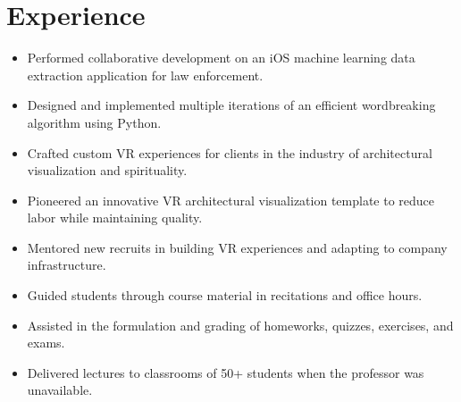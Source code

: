\documentclass[]{deedy_resume}
\begin{document}
\hfill
\begin{minipage}[t]{0.63\textwidth} 


\section{Experience}
\begin{itemize}[noitemsep,topsep=0pt]
\item Performed collaborative development on an iOS machine learning data extraction application for law enforcement.
\item Designed and implemented multiple iterations of an efficient wordbreaking algorithm using Python.
\end{itemize}
\vspace{3mm}

\begin{itemize}[noitemsep,topsep=0pt]
\item Crafted custom VR experiences for clients in the industry of architectural visualization and spirituality.
\item Pioneered an innovative VR architectural visualization template to reduce labor while maintaining quality.
\item Mentored new recruits in building VR experiences and adapting to company infrastructure.
\end{itemize}
\vspace{3mm}

\begin{itemize}[noitemsep,topsep=0pt]
\itemsep0em 
\item Guided students through course material in recitations and office hours.
\item Assisted in the formulation and grading of homeworks, quizzes, exercises, and exams.
\item Delivered lectures to classrooms of 50+ students when the professor was unavailable.
\end{itemize}
\sectionsep


\end{minipage}
\end{document}
